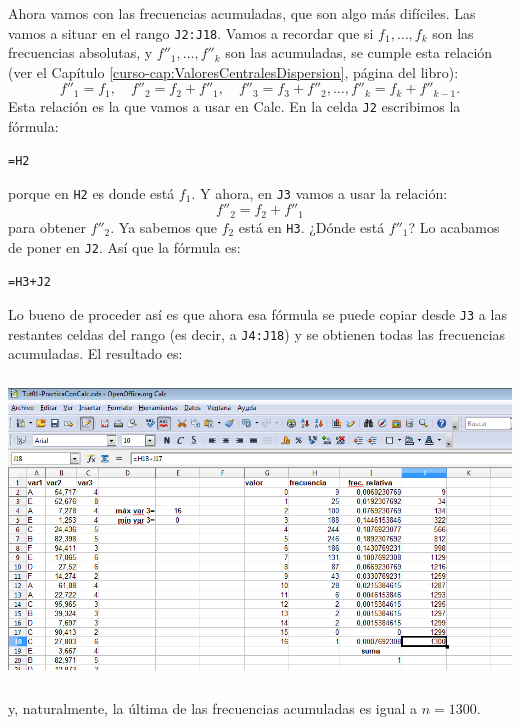 \documentclass[10pt,a4paper]{article}\usepackage[]{graphicx}\usepackage[]{color}
\begin{document}
Ahora vamos con las frecuencias acumuladas, que son algo más difíciles. Las vamos a situar en el rango {\tt J2:J18}. Vamos a recordar que si $f_1,\ldots,f_k$ son las frecuencias absolutas, y $f''_1,\ldots,f''_k$ son las acumuladas, se cumple esta relación (ver el Capítulo \ref{curso-cap:ValoresCentralesDispersion}, página \pageref{curso-cap02:subsubsec:MedianaTablasFrecuenciasRelativasAcumuladas} del libro):
\[f''_1=f_1,\quad f''_2=f_2+f''_1,\quad f''_3=f_3+f''_2,\ldots,f''_k=f_k+f''_{k-1}.\]
Esta relación es la que vamos a usar en Calc. En la celda {\tt J2} escribimos la fórmula:
\begin{center}
{\tt =H2}
\end{center}
porque en {\tt H2} es donde está $f_1$. Y ahora, en {\tt J3} vamos a usar la relación:
\[f''_2=f_2+f''_1\]
para obtener $f''_2$. Ya sabemos que $f_2$ está en {\tt H3}. ¿Dónde está $f''_1$? Lo acabamos de poner en {\tt J2}. Así que la fórmula es:
\begin{center}
{\tt =H3+J2}
\end{center}
Lo bueno de proceder así es que ahora esa fórmula se puede copiar desde {\tt J3} a las restantes celdas del rango (es decir, a {\tt J4:J18}) y se obtienen todas las frecuencias acumuladas. El resultado es:
    \begin{center}
    \includegraphics[height=8cm]{../fig/Tut03-06.png}
    \end{center}
y, naturalmente, la última de las frecuencias acumuladas es igual a $n=1300$.
\end{document}
